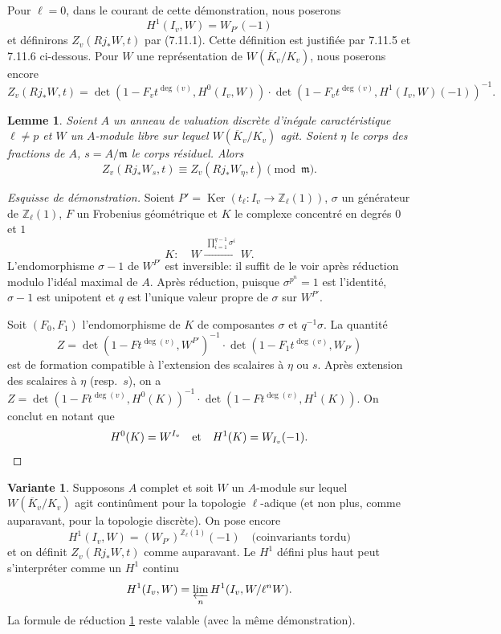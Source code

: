 \documentclass[11pt,a4paper]{amsart}
\theoremstyle{plain}
\newtheorem{lemma}[theorem]{Lemme}
\theoremstyle{definition}
\newtheorem{variant}[theorem]{Variante}
\DeclareMathOperator{\Ker}{Ker}
\newcommand{\dbZ}{\mathbb{Z}}
\newenvironment{variante}{\begin{variant}}{\end{variant}}
\newcommand{\ov}[1]{\overline{#1}}
\begin{document}
Pour $\ell = 0$, dans le courant de cette d\'emonstration, nous poserons
\[
H^{1}(I_{v}, W) = W_{P'}(-1)
\]
et d\'efinirons $Z_{v}(Rj_{*}W,t)$ par (7.11.1). Cette d\'efinition est justifi\'ee par 7.11.5 et 7.11.6 ci-dessous. Pour $W$ une repr\'esentation de $W(\ov{K}_{v}/K_{v})$, nous poserons encore
\[
Z_{v}(Rj_{*}W,t) = \det(1 - F_{v}t^{\deg(v)}, H^{0}(I_{v},W)) \cdot \det(1 - F_{v}t^{\deg(v)}, H^{1}(I_{v},W)(-1))^{-1}.
\]

\begin{lemma}\label{lem7.11.5}
Soient $A$ un anneau de valuation discr\`ete d'in\'egale caract\'eristique $\ell \not= p$ et $W$ un $A$-module libre sur lequel $W(\ov{K}_{v}/K_{v})$ agit. Soient $\eta$ le corps des fractions de $A$, $s = A/\mathfrak{m}$ le corps r\'esiduel. Alors
\[
Z_{v}(Rj_{*}W_{s},t) \equiv Z_{v}(Rj_{*}W_{\eta},t) \pmod{\mathfrak{m}}.
\]
\end{lemma}

\begin{proof}[Esquisse de d\'emonstration]
Soient $P' = \Ker(t_{\ell}: I_{v} \to \dbZ_{\ell}(1))$, $\sigma$ un g\'en\'erateur de $\dbZ_{\ell}(1)$, $F$ un Frobenius g\'eom\'etrique et $K$ le complexe concentr\'e en degr\'es $0$ et $1$
\[
K: \quad W \xrightarrow{\ \prod_{i=1}^{q-1} \sigma^{i}\ } W.
\]
L'endomorphisme $\sigma - 1$ de $W^{P'}$ est inversible: il suffit de le voir apr\`es r\'eduction modulo l'id\'eal maximal de $A$. Apr\`es r\'eduction, puisque $\sigma^{p^{n}} = 1$ est l'identit\'e, $\sigma - 1$ est unipotent et $q$ est l'unique valeur propre de $\sigma$ sur $W^{P'}$. 

Soit $(F_{0}, F_{1})$ l'endomorphisme de $K$ de composantes $\sigma$ et $q^{-1}\sigma$. La quantit\'e
\[
Z = \det(1 - Ft^{\deg(v)}, W^{P'})^{-1} \cdot \det(1 - F_{1}t^{\deg(v)}, W_{P'})
\]
est de formation compatible \`a l'extension des scalaires \`a $\eta$ ou $s$. Apr\`es extension des scalaires \`a $\eta$ (resp.~$s$), on a $Z = \det(1 - Ft^{\deg(v)}, H^{0}(K))^{-1} \cdot \det(1 - Ft^{\deg(v)}, H^{1}(K))$. On conclut en notant que
\[
H^{0}(K) = W^{I_{v}} \quad \text{et} \quad H^{1}(K) = W_{I_{v}}(-1).
\qedhere
\]
\end{proof}

\begin{variante}
Supposons $A$ complet et soit $W$ un $A$-module sur lequel $W(\ov{K}_{v}/K_{v})$ agit contin\^ument pour la topologie $\ell$-adique (et non plus, comme auparavant, pour la topologie discr\`ete). On pose encore
\[
H^{1}(I_{v}, W) = (W_{P'})^{\dbZ_{\ell}(1)}(-1) \quad \text{(coinvariants tordu)}
\]
et on d\'efinit $Z_{v}(Rj_{*}W,t)$ comme auparavant. Le $H^{1}$ d\'efini plus haut peut s'interpr\'eter comme un $H^{1}$ continu
\begin{equation}
H^{1}(I_{v}, W) = \varprojlim_{n} H^{1}(I_{v}, W/\ell^{n}W).
\end{equation}
La formule de r\'eduction \ref{lem7.11.5} reste valable (avec la m\^eme d\'emonstration).
\end{variante}
\end{document}
